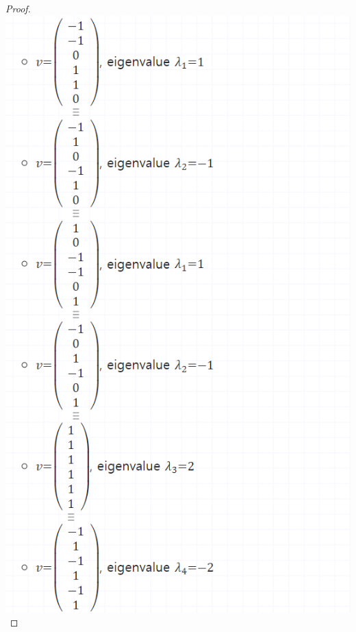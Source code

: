 \documentclass[a4paper, 12pt]{article}
\begin{document}
\begin{proof}
\includegraphics[width=1\linewidth]{image.png} \\

\end{proof}
\end{document}

